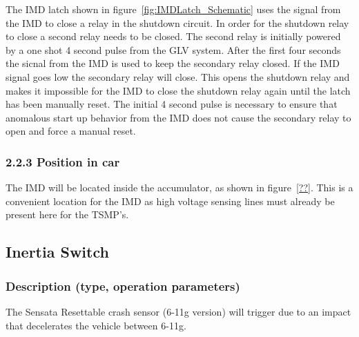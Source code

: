 \documentclass{article}
\begin{document}
The IMD latch shown in figure~\ref{fig:IMDLatch_Schematic} uses the signal from the IMD to close a relay in the shutdown circuit. In order for the shutdown relay to close a second relay needs to be closed. The second relay is initially powered by a one shot 4 second pulse from the GLV system. After the first four seconds the sicnal from the IMD is used to keep the secondary relay closed. If the IMD signal goes low the secondary relay will close. This opens the shutdown relay and makes it impossible for the IMD to close the shutdown relay again until the latch has been manually reset. The initial 4 second pulse is necessary to ensure that anomalous start up behavior from the IMD does not cause the secondary relay to open and force a manual reset.


\subsubsection*{2.2.3 Position in car}

The IMD will be located inside the accumulator, as shown in figure~\ref{??}. This is a convenient location for the IMD as high voltage sensing lines must already be present here for the TSMP’s.









\subsection{Inertia Switch}
\subsubsection{Description (type, operation parameters)}
The Sensata Resettable crash sensor (6-11g version) will trigger due to an impact that decelerates the vehicle between 6-11g.
\end{document}
